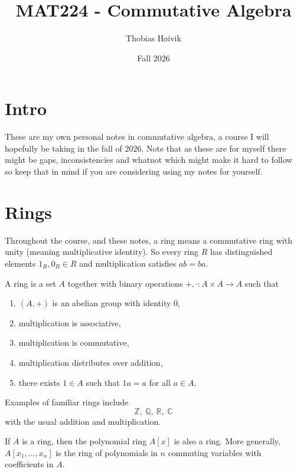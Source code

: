 \documentclass[11pt]{article}
\title{\huge{MAT224 - Commutative Algebra}}
\author{\LARGE{Thobias Høivik}}
\date{Fall 2026}
\begin{document}
\maketitle

\tableofcontents

\newpage
\section*{Intro}
These are my own personal notes in commutative algebra, 
a course I will hopefully be taking in the fall of 2026. 
Note that as these are for myself there might be gaps, inconsistencies
and whatnot which might make it hard to follow so 
keep that in mind if you are considering using my notes for 
yourself. 

\section{Rings}
Throughout the course, and these notes, a ring means 
a commutative ring with unity (meaning multiplicative 
identity).
So every ring $R$ has distinguished elements 
$1_R, 0_R \in R$ and multiplication satisfies 
$ab = ba$. 

\begin{defn}
    A ring is a set $A$ together with binary 
    operations $+,\cdot : A \times A \to A$ such that 
    \begin{enumerate}
        \item $(A,+)$ is an abelian group with 
            identity $0$, 
        \item multiplication is associative, 
        \item multiplication is commutative, 
        \item multiplication distributes over addition, 
        \item there exists $1 \in A$ such that 
            $1a = a$ for all $a \in A$. 
    \end{enumerate}
\end{defn}
\begin{ex}
    Examples of familiar rings include 
    \[
        \mathbb Z, \ \mathbb Q, \ \mathbb R, \ \mathbb C
    \]
    with the usual addition and multiplication. 
\end{ex}
If $A$ is a ring, then the polynomial ring $A[x]$ is 
also a ring. More generally, 
$A[x_1,\ldots,x_n]$ is the ring of polynomials in $n$ commuting 
variables with coefficients in $A$. 
\end{document}
